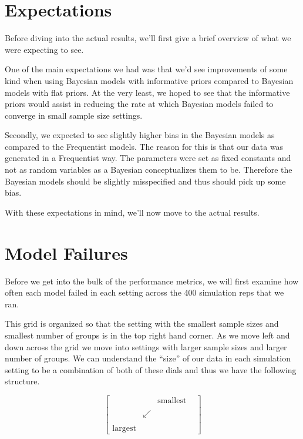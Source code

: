 \documentclass[12pt,twoside]{reedthesis}
\begin{document}
\hypertarget{expectations}{%
\section{Expectations}\label{expectations}}

Before diving into the actual results, we'll first give a brief overview of what we were expecting to see.

One of the main expectations we had was that we'd see improvements of some kind when using Bayesian models with informative priors compared to Bayesian models with flat priors. At the very least, we hoped to see that the informative priors would assist in reducing the rate at which Bayesian models failed to converge in small sample size settings.

Secondly, we expected to see slightly higher bias in the Bayesian models as compared to the Frequentist models. The reason for this is that our data was generated in a Frequentist way. The parameters were set as fixed constants and not as random variables as a Bayesian conceptualizes them to be. Therefore the Bayesian models should be slightly misspecified and thus should pick up some bias.

With these expectations in mind, we'll now move to the actual results.

\hypertarget{model-failures}{%
\section{Model Failures}\label{model-failures}}

Before we get into the bulk of the performance metrics, we will first examine how often each model failed in each setting across the 400 simulation reps that we ran.

This grid is organized so that the setting with the smallest sample sizes and smallest number of groups is in the top right hand corner. As we move left and down across the grid we move into settings with larger sample sizes and larger number of groups. We can understand the ``size'' of our data in each simulation setting to be a combination of both of these dials and thus we have the following structure.

\[
\begin{bmatrix}
 &  & \text{smallest} \\
 & & & \\
 & \swarrow &  \\
 & & & \\
\text{largest} & & 
\end{bmatrix}
\]
\end{document}
